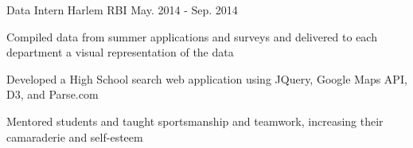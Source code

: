 \begin{cventries}
\iftrue
  \cventry
    {Data Intern} %
    {Harlem RBI} %
	{May. 2014 - Sep. 2014} %
    {} %
    {
      \begin{cvitems} %
        \item {Compiled data from summer applications and surveys and delivered to each department a visual representation of the data}
        \item {Developed a High School search web application using JQuery, Google Maps API, D3, and Parse.com}
        \item {Mentored students and taught sportsmanship and teamwork, increasing their camaraderie and self-esteem}
      \end{cvitems}
    }
\fi

\iffalse
  \cventry
    {Video Game Programmer Intern} %
    {Surprise Entertainment} %
	{Jun. 2013 - Sep. 2014} %
    {} %
    {
      \begin{cvitems} %
        \item {Recreated Pong using Unity and created variations to the game}
        \item {Worked on a top down beat ‘em up using C\# and Unity}
        \item {Used Teambox to set goals and commit to our Github}
      \end{cvitems}
    }
\fi


\end{cventries}
